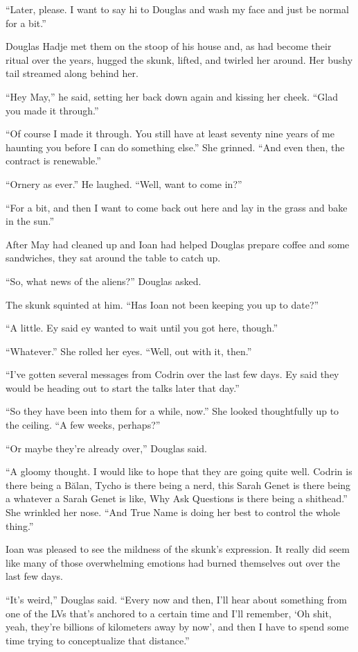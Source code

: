 ``Later, please. I want to say hi to Douglas and wash my face and just be normal for a bit.''

Douglas Hadje met them on the stoop of his house and, as had become their ritual over the years, hugged the skunk, lifted, and twirled her around. Her bushy tail streamed along behind her.

``Hey May,'' he said, setting her back down again and kissing her cheek. ``Glad you made it through.''

``Of course I made it through. You still have at least seventy nine years of me haunting you before I can do something else.'' She grinned. ``And even then, the contract is renewable.''

``Ornery as ever.'' He laughed. ``Well, want to come in?''

``For a bit, and then I want to come back out here and lay in the grass and bake in the sun.''

After May had cleaned up and Ioan had helped Douglas prepare coffee and some sandwiches, they sat around the table to catch up.

``So, what news of the aliens?'' Douglas asked.

The skunk squinted at him. ``Has Ioan not been keeping you up to date?''

``A little. Ey said ey wanted to wait until you got here, though.''

``Whatever.'' She rolled her eyes. ``Well, out with it, then.''

``I've gotten several messages from Codrin over the last few days. Ey said they would be heading out to start the talks later that day.''

``So they have been into them for a while, now.'' She looked thoughtfully up to the ceiling. ``A few weeks, perhaps?''

``Or maybe they're already over,'' Douglas said.

``A gloomy thought. I would like to hope that they are going quite well. Codrin is there being a Bălan, Tycho is there being a nerd, this Sarah Genet is there being a whatever a Sarah Genet is like, Why Ask Questions is there being a shithead.'' She wrinkled her nose. ``And True Name is doing her best to control the whole thing.''

Ioan was pleased to see the mildness of the skunk's expression. It really did seem like many of those overwhelming emotions had burned themselves out over the last few days.

``It's weird,'' Douglas said. ``Every now and then, I'll hear about something from one of the LVs that's anchored to a certain time and I'll remember, `Oh shit, yeah, they're billions of kilometers away by now', and then I have to spend some time trying to conceptualize that distance.''


